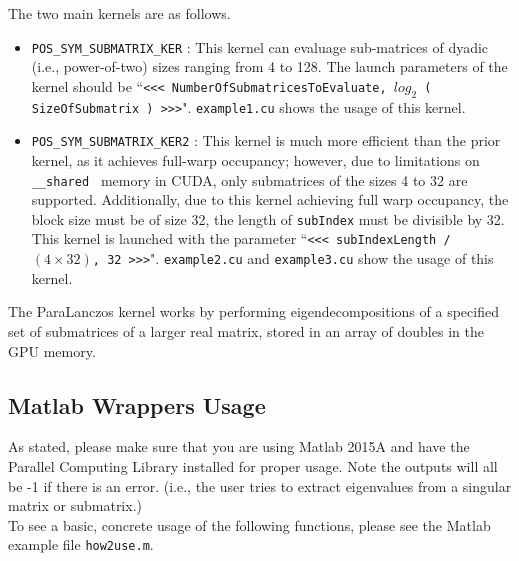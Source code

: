 \documentclass{amsart}
\begin{document}
The two main kernels are as follows.

\begin{itemize}
\item {\tt POS\_SYM\_SUBMATRIX\_KER} :  This kernel can evaluage sub-matrices of dyadic (i.e., power-of-two) sizes ranging from 4 to 128.  The launch parameters of the kernel should be ``{\tt <<< NumberOfSubmatricesToEvaluate, $log_{2} $ ( SizeOfSubmatrix ) >>>}".  {\tt example1.cu} shows the usage of this kernel.
\item {\tt POS\_SYM\_SUBMATRIX\_KER2} : This kernel is much more efficient than the prior kernel, as it achieves full-warp occupancy;  however, due to limitations on {\tt \_\_shared } memory in CUDA, only submatrices of the sizes 4 to 32 are supported.  Additionally, due to this kernel achieving full warp occupancy, the block size must be of size 32, the length of {\tt subIndex} must be divisible by 32.  This kernel is launched with the parameter ``{\tt <<< subIndexLength / $(4 \times 32)$, 32 >>>}".  {\tt example2.cu} and {\tt example3.cu} show the usage of this kernel. 
\end{itemize}

The ParaLanczos kernel works by performing eigendecompositions of a specified set of submatrices of a larger real matrix, stored in an array of doubles in the GPU memory.\\




\subsection{Matlab Wrappers Usage}

As stated, please make sure that you are using Matlab 2015A and have the Parallel Computing Library installed for proper usage.  Note the outputs will all be -1 if there is an error. (i.e., the user tries to extract eigenvalues from a singular matrix or submatrix.)\\

To see a basic, concrete usage of the following functions, please see the Matlab example file {\tt how2use.m}.
\end{document}
